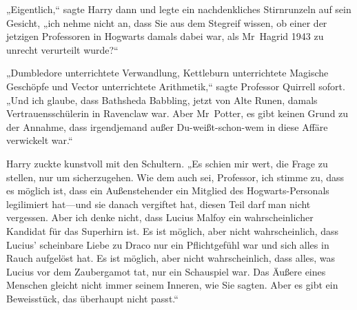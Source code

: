 „Eigentlich,“ sagte Harry dann und legte ein nachdenkliches Stirnrunzeln auf sein Gesicht, „ich nehme nicht an, dass Sie aus dem Stegreif wissen, ob einer der jetzigen Professoren in Hogwarts damals dabei war, als Mr~Hagrid 1943 zu unrecht verurteilt wurde?“

„Dumbledore unterrichtete Verwandlung, Kettleburn unterrichtete Magische Geschöpfe und Vector unterrichtete Arithmetik,“ sagte Professor Quirrell sofort. „Und ich glaube, dass Bathsheda Babbling, jetzt von Alte Runen, damals Vertrauensschülerin in Ravenclaw war. Aber Mr~Potter, es gibt keinen Grund zu der Annahme, dass irgendjemand außer Du-weißt-schon-wem in diese Affäre verwickelt war.“

Harry zuckte kunstvoll mit den Schultern. „Es schien mir wert, die Frage zu stellen, nur um sicherzugehen. Wie dem auch sei, Professor, ich stimme zu, dass es möglich ist, dass ein Außenstehender ein Mitglied des Hogwarts-Personals legilimiert hat—und sie danach vergiftet hat, diesen Teil darf man nicht vergessen. Aber ich denke nicht, dass Lucius Malfoy ein wahrscheinlicher Kandidat für das Superhirn ist. Es ist möglich, aber nicht wahrscheinlich, dass Lucius' scheinbare Liebe zu Draco nur ein Pflichtgefühl war und sich alles in Rauch aufgelöst hat. Es ist möglich, aber nicht wahrscheinlich, dass alles, was Lucius vor dem Zaubergamot tat, nur ein Schauspiel war. Das Äußere eines Menschen gleicht nicht immer seinem Inneren, wie Sie sagten. Aber es gibt ein Beweisstück, das überhaupt nicht passt.“

